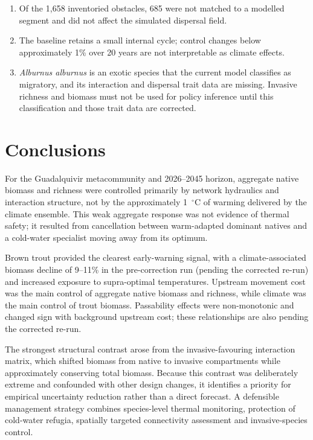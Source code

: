 \documentclass[11pt,a4paper]{article}
\begin{document}
\begin{enumerate}
    \item Of the 1,658 inventoried obstacles, 685 were not matched to a modelled segment and did not affect the simulated dispersal field.
    \item The baseline retains a small internal cycle; control changes below approximately 1\% over 20 years are not interpretable as climate effects.
    \item \textit{Alburnus alburnus} is an exotic species that the current model classifies as migratory, and its interaction and dispersal trait data are missing. Invasive richness and biomass must not be used for policy inference until this classification and those trait data are corrected.
\end{enumerate}

\section{Conclusions}

For the Guadalquivir metacommunity and 2026--2045 horizon, aggregate native biomass and richness were controlled primarily by network hydraulics and interaction structure, not by the approximately 1~$^\circ$C of warming delivered by the climate ensemble. This weak aggregate response was not evidence of thermal safety; it resulted from cancellation between warm-adapted dominant natives and a cold-water specialist moving away from its optimum.

Brown trout provided the clearest early-warning signal, with a climate-associated biomass decline of 9--11\% in the pre-correction run (pending the corrected re-run) and increased exposure to supra-optimal temperatures. Upstream movement cost was the main control of aggregate native biomass and richness, while climate was the main control of trout biomass. Passability effects were non-monotonic and changed sign with background upstream cost; these relationships are also pending the corrected re-run.

The strongest structural contrast arose from the invasive-favouring interaction matrix, which shifted biomass from native to invasive compartments while approximately conserving total biomass. Because this contrast was deliberately extreme and confounded with other design changes, it identifies a priority for empirical uncertainty reduction rather than a direct forecast. A defensible management strategy combines species-level thermal monitoring, protection of cold-water refugia, spatially targeted connectivity assessment and invasive-species control.
\end{document}
